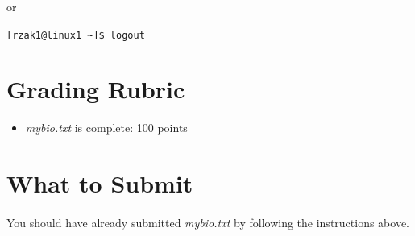 \documentclass[letter,11pt]{article}
\begin{document}
or

\verb|[rzak1@linux1 ~]$ logout|

\section*{Grading Rubric}
\begin{itemize}
    \item \textit{mybio.txt} is complete: 100 points
\end{itemize}

\section*{What to Submit}
\paragraph{}You should have already submitted \textit{mybio.txt} by following the instructions above.
\end{document}
